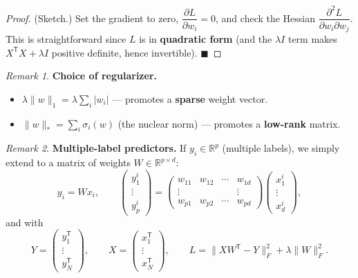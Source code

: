 \documentclass[
  letterpaper,
  DIV=11,
  numbers=noendperiod]{scrreprt}
\providecommand{\tightlist}{%
  \setlength{\itemsep}{0pt}\setlength{\parskip}{0pt}}
\theoremstyle{definition}
\theoremstyle{plain}
\theoremstyle{plain}
\theoremstyle{definition}
\theoremstyle{plain}
\theoremstyle{plain}
\theoremstyle{remark}
\newtheorem*{remark}{Remark}
\begin{document}
\begin{proof}
(Sketch.) Set the gradient to zero,
\(\dfrac{\partial L}{\partial w_i} = 0\), and check the Hessian
\(\dfrac{\partial^2 L}{\partial w_i \partial w_j}\). This is
straightforward since \(L\) is in \textbf{quadratic form} (and the
\(\lambda I\) term makes \(X^{\mathsf T} X + \lambda I\) positive
definite, hence invertible). \(\blacksquare\)
\end{proof}

\begin{remark}
\textbf{Choice of regularizer.}

\begin{itemize}
\tightlist
\item
  \(\lambda \|w\|_1 = \lambda \sum_i |w_i|\) --- promotes a
  \textbf{sparse} weight vector.
\item
  \(\|w\|_\ast = \sum_i \sigma_i(w)\) (the nuclear norm) --- promotes a
  \textbf{low-rank} matrix.
\end{itemize}

\end{remark}

\begin{remark}
\textbf{Multiple-label predictors.} If \(y_i \in \mathbb{R}^p\)
(multiple labels), we simply extend to a matrix of weights
\(W \in \mathbb{R}^{p \times d}\): \[
y_i = W x_i,
\qquad
\begin{pmatrix} y_1^i \\ \vdots \\ y_p^i \end{pmatrix}
=
\begin{pmatrix}
w_{11} & w_{12} & \cdots & w_{1d} \\
\vdots & & & \vdots \\
w_{p1} & w_{p2} & \cdots & w_{pd}
\end{pmatrix}
\begin{pmatrix} x_1^i \\ \vdots \\ x_d^i \end{pmatrix} ,
\] and with \[
Y = \begin{pmatrix} y_1^{\mathsf T} \\ \vdots \\ y_N^{\mathsf T} \end{pmatrix},
\qquad
X = \begin{pmatrix} x_1^{\mathsf T} \\ \vdots \\ x_N^{\mathsf T} \end{pmatrix},
\qquad
L = \|X W^{\mathsf T} - Y\|_F^2 + \lambda \|W\|_F^2 .
\]
\end{remark}
\end{document}
